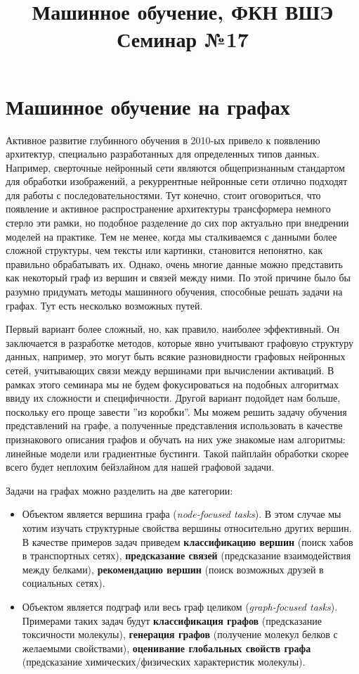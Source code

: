 \documentclass[12pt,a4paper]{article}
\title{Машинное обучение, ФКН ВШЭ\\Семинар №17}
\author{}
\date{}
\begin{document}
\maketitle

\section{Машинное обучение на графах}

Активное развитие глубинного обучения в 2010-ых привело к появлению архитектур, специально разработанных для определенных типов данных. Например, сверточные нейронный сети являются общепризнанным стандартом для обработки изображений, а рекуррентные нейронные сети отлично подходят для работы с последовательностями. Тут конечно, стоит оговориться, что появление и активное распространение архитектуры трансформера немного стерло эти рамки, но подобное разделение до сих пор актуально при внедрении моделей на практике. Тем не менее, когда мы сталкиваемся с данными более сложной структуры, чем тексты или картинки, становится непонятно, как правильно обрабатывать их. Однако, очень многие данные можно представить как некоторый граф из вершин и связей между ними. По этой причине было бы разумно придумать методы машинного обучения, способные решать задачи на графах. Тут есть несколько возможных путей.

Первый вариант более сложный, но, как правило, наиболее эффективный. Он заключается в разработке методов, которые явно учитывают графовую структуру данных, например, это могут быть всякие разновидности графовых нейронных сетей, учитывающих связи между вершинами при вычислении активаций. В рамках этого семинара мы не будем фокусироваться на подобных алгоритмах ввиду их сложности и специфичности. Другой вариант подойдет нам больше, поскольку его проще завести ''из коробки''. Мы можем решить задачу обучения представлений на графе, а полученные представления использовать в качестве признакового описания графов и обучать на них уже знакомые нам алгоритмы: линейные модели или градиентные бустинги. Такой пайплайн обработки скорее всего будет неплохим бейзлайном для нашей графовой задачи.

Задачи на графах можно разделить на две категории:
\begin{itemize}
    \item Объектом является вершина графа (\emph{node-focused tasks}). В этом случае мы хотим изучать структурные свойства вершины относительно других вершин. В качестве примеров задач приведем \textbf{классификацию вершин} (поиск хабов в транспортных сетях), \textbf{предсказание связей} (предсказание взаимодействия между белками), \textbf{рекомендацию вершин} (поиск возможных друзей в социальных сетях).

    \item Объектом является подграф или весь граф целиком (\emph{graph-focused tasks}). Примерами таких задач будут \textbf{классификация графов} (предсказание токсичности молекулы), \textbf{генерация графов} (получение молекул белков с желаемыми свойствами), \textbf{оценивание глобальных свойств графа} (предсказание химических/физических характеристик молекулы).
\end{itemize}
\end{document}
